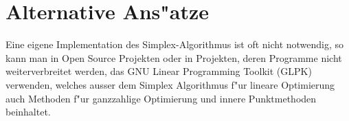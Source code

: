 \section{Alternative Ans"atze}
Eine eigene Implementation des Simplex-Algorithmus ist oft nicht
notwendig, so kann man in Open Source Projekten oder in Projekten,
deren Programme nicht weiterverbreitet werden, das GNU Linear
Programming Toolkit (GLPK) verwenden, welches ausser dem
Simplex Algorithmus f"ur lineare Optimierung auch Methoden f"ur
ganzzahlige Optimierung und innere Punktmethoden beinhaltet.
